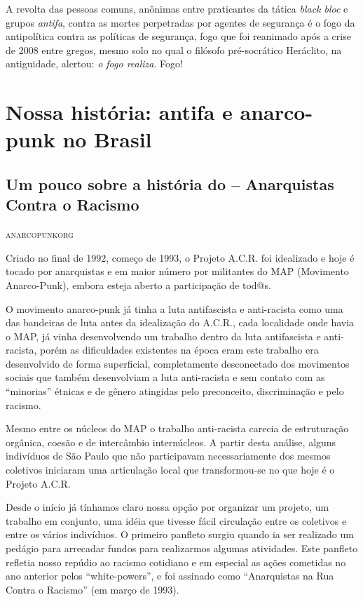 A revolta das pessoas comuns, anônimas entre praticantes da tática
\emph{black bloc} e grupos \emph{antifa}, contra as mortes perpetradas
por agentes de segurança é o fogo da antipolítica contra as políticas de
segurança, fogo que foi reanimado após a crise de 2008 entre gregos,
mesmo solo no qual o filósofo pré-socrático Heráclito, na antiguidade,
alertou: \emph{o fogo realiza}. Fogo!


\part{Nossa história: antifa e anarco-punk no Brasil}

\chapter{Um pouco sobre a história do  -- Anarquistas Contra o Racismo}

\hfill{}\textsc{anarcopunkorg}

\bigskip

Criado no final de 1992, começo de 1993, o Projeto A.C.R. foi idealizado e hoje é tocado por anarquistas e em maior número por militantes do MAP (Movimento Anarco-Punk), embora esteja aberto a participação de tod@s.

O movimento anarco-punk já tinha a luta antifascista e anti-racista como uma das bandeiras de luta antes da idealização do A.C.R., cada localidade onde havia o MAP, já vinha desenvolvendo um trabalho dentro da luta antifascista e anti-racista, porém as dificuldades existentes na época eram este trabalho era desenvolvido de forma superficial, completamente desconectado dos movimentos sociais que também desenvolviam a luta anti-racista e sem contato com as “minorias” étnicas e de gênero atingidas pelo preconceito, discriminação e pelo racismo.

Mesmo entre os núcleos do MAP o trabalho anti-racista carecia de estruturação orgânica, coesão e de intercâmbio internúcleos. A partir desta análise, alguns indivíduos de São Paulo que não participavam necessariamente dos mesmos coletivos iniciaram uma articulação local que transformou-se no que hoje é o Projeto A.C.R.

Desde o início já tínhamos claro nossa opção por organizar um projeto, um trabalho em conjunto, uma idéia que tivesse fácil circulação entre os coletivos e entre os vários indivíduos. O primeiro panfleto surgiu quando ia ser realizado um pedágio para arrecadar fundos para realizarmos algumas atividades. Este panfleto refletia nosso repúdio ao racismo cotidiano e em especial as ações cometidas no ano anterior pelos “white-powers”, e foi assinado como “Anarquistas na Rua Contra o Racismo” (em março de 1993).

